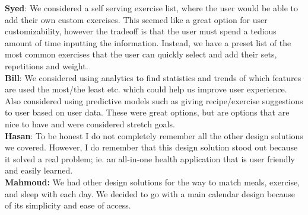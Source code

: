 \documentclass[12pt, titlepage]{article}
\begin{document}
\begin{enumerate}
		\textbf{Syed}: We considered a self serving exercise list, where the user would be able to add their own custom exercises. This seemed like a great option for user customizability, however the tradeoff is that the user must spend a tedious amount of time inputting the information. Instead, we have a preset list of the most common exercises that the user can quickly select and add their sets, repetitions and weight. \\
		\textbf{Bill}: We considered using analytics to find statistics and trends of which features are used the most/the least etc. which could help us improve user experience. Also considered using predictive models such as giving recipe/exercise suggestions to user based on user data. These were great options, but are options that are nice to have and were considered stretch goals. \\
		\textbf{Hasan}: To be honest I do not completely remember all the other design solutions we covered. However, I do remember that this design solution stood out because it solved a real problem; ie. an all-in-one health application that is user friendly and easily learned. \\
		\textbf{Mahmoud:} We had other design solutions for the way to match meals, exercise, and sleep with each day. We decided to go with a main calendar design because of its simplicity and ease of access. 
	\end{enumerate}
	
\end{document}
